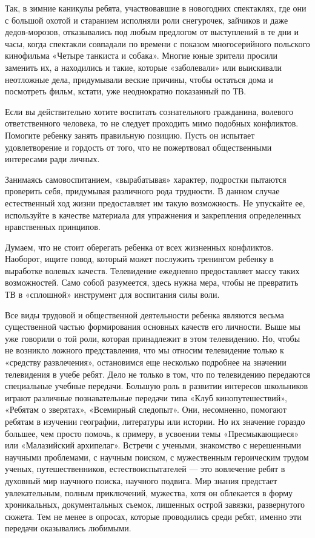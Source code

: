 \documentclass[12pt, a4paper, openany]{book}
\begin{document}
Так, в зимние каникулы ребята, участвовавшие в новогодних спектаклях, где они с большой охотой и старанием исполняли роли снегурочек, зайчиков и даже дедов-морозов, отказывались под любым предлогом от выступлений в те дни и часы, когда спектакли совпадали по времени с показом многосерийного польского кинофильма «Четыре танкиста и собака». Многие юные зрители просили заменить их, а находились и такие, которые «заболевали» или выискивали неотложные дела, придумывали веские причины, чтобы остаться дома и посмотреть фильм, кстати, уже неоднократно показанный по ТВ. 

Если вы действительно хотите воспитать сознательного гражданина, волевого ответственного человека, то не следует проходить мимо подобных конфликтов. Помогите ребенку занять правильную позицию. Пусть он испытает удовлетворение и гордость от того, что не пожертвовал общественными интересами ради личных. 

Занимаясь самовоспитанием, «вырабатывая» характер, подростки пытаются проверить себя, придумывая различного рода трудности. В данном случае естественный ход жизни предоставляет им такую возможность. Не упускайте ее, используйте в качестве материала для упражнения и закрепления определенных нравственных принципов. 

Думаем, что не стоит оберегать ребенка от всех жизненных конфликтов. Наоборот, ищите повод, который может послужить тренингом ребенку в выработке волевых качеств. Телевидение ежедневно предоставляет массу таких возможностей. Само собой разумеется, здесь нужна мера, чтобы не превратить ТВ в «сплошной» инструмент для воспитания силы воли. 

Все виды трудовой и общественной деятельности ребенка являются весьма существенной частью формирования основных качеств его личности. Выше мы уже говорили о той роли, которая принадлежит в этом телевидению. Но, чтобы не возникло ложного представления, что мы относим телевидение только к «средству развлечения», остановимся еще несколько подробнее на значении телевидения в учебе ребят. Дело не только в том, что по телевидению передаются специальные учебные передачи. Большую роль в развитии интересов школьников играют различные познавательные передачи типа «Клуб кинопутешествий», «Ребятам о зверятах», «Всемирный следопыт». Они, несомненно, помогают ребятам в изучении географии, литературы или истории. Но их значение гораздо большее, чем просто помочь, к примеру, в усвоении темы «Пресмыкающиеся» или «Малазийский архипелаг». Встречи с учеными, знакомство с нерешенными научными проблемами, с научным поиском, с мужественным героическим трудом ученых, путешественников, естествоиспытателей — это вовлечение ребят в духовный мир научного поиска, научного подвига. Мир знания предстает увлекательным, полным приключений, мужества, хотя он облекается в форму хроникальных, документальных съемок, лишенных острой завязки, развернутого сюжета. Тем не менее в опросах, которые проводились среди ребят, именно эти передачи оказывались любимыми. 
\end{document}
